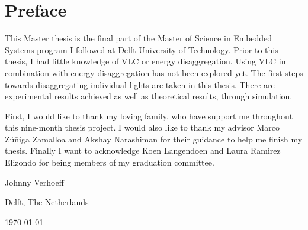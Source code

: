 
\chapter*{Preface}



This Master thesis is the final part of the Master of Science in Embedded Systems program I followed at Delft University of Technology.
Prior to this thesis, I had little knowledge of VLC or energy disaggregation.
Using VLC in combination with energy disaggregation has not been explored yet.
The first steps towards disaggregating individual lights are taken in this thesis.
There are experimental results achieved as well as theoretical results, through simulation.







\vspace{1\baselineskip}

\noindent



First, I would like to thank my loving family, who have support me throughout this nine-month thesis project.
I would also like to thank my advisor Marco Z\'u\~niga Zamalloa and Akshay Narashiman for their guidance to help me finish my thesis.
Finally I want to acknowledge Koen Langendoen and Laura Ramirez Elizondo for being members of my graduation committee.







\vspace{1\baselineskip}

\noindent
Johnny Verhoeff

\vspace{1\baselineskip}

\noindent
Delft, The Netherlands

\noindent
\today
